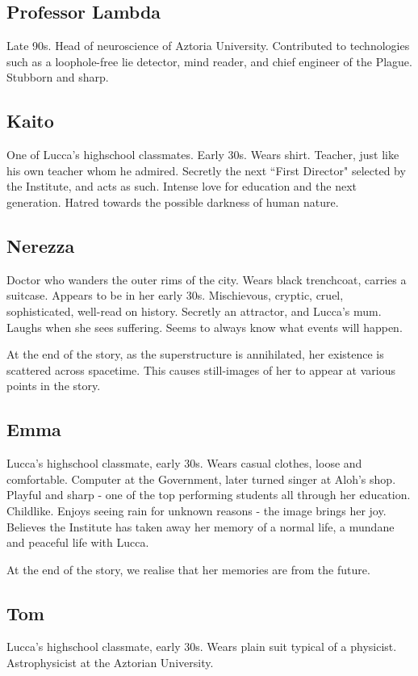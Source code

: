\documentclass[11pt]{article}
\begin{document}
	\subsection{Professor Lambda}
	Late 90s.
	Head of neuroscience of Aztoria University.
	Contributed to technologies such as a loophole-free lie detector, mind reader, and chief engineer of the Plague.
	Stubborn and sharp.
	\subsection{Kaito}
	One of Lucca's highschool classmates.
	Early 30s.
	Wears shirt.
	Teacher, just like his own teacher whom he admired.
	Secretly the next ``First Director" selected by the Institute, and acts as such.
	Intense love for education and the next generation.
	Hatred towards the possible darkness of human nature.
	\subsection{Nerezza}
	Doctor who wanders the outer rims of the city.
	Wears black trenchcoat, carries a suitcase.
	Appears to be in her early 30s.
	Mischievous, cryptic, cruel, sophisticated, well-read on history.
	Secretly an attractor, and Lucca's mum. 
	Laughs when she sees suffering.
	Seems to always know what events will happen.
	
	At the end of the story, as the superstructure is annihilated, her existence is scattered across spacetime. 
	This causes still-images of her to appear at various points in the story. 
	\subsection{Emma}
	Lucca's highschool classmate, early 30s.
	Wears casual clothes, loose and comfortable. 
	Computer at the Government, later turned singer at Aloh's shop.
	Playful and sharp - one of the top performing students all through her education.
	Childlike.
	Enjoys seeing rain for unknown reasons - the image brings her joy. 
	Believes the Institute has taken away her memory of a normal life, a mundane and peaceful life with Lucca.
	
	At the end of the story, we realise that her memories are from the future.
	\subsection{Tom}
	Lucca's highschool classmate, early 30s.
	Wears plain suit typical of a physicist.
	Astrophysicist at the Aztorian University. 
	
\end{document}
